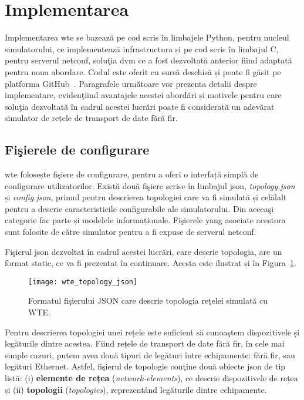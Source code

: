 \section{Implementarea}

Implementarea \gls{wte} se bazează pe cod scris în limbajele Python, pentru nucleul simulatorului, ce implementează infrastructura și pe cod scris în limbajul C, pentru serverul \gls{netconf}, soluţia \gls{dvm} ce a fost dezvoltată anterior fiind adaptată pentru noua abordare. Codul este oferit cu sursă deschisă și poate fi găsit pe platforma GitHub~\cite{wte2017}. Paragrafele următoare vor prezenta detalii despre implementare, evidenţiind avantajele acestei abordări și motivele pentru care soluţia dezvoltată în cadrul acestei lucrări poate fi considerată un adevărat simulator de rețele de transport de date fără fir. 

\subsection{Fişierele de configurare}

\gls{wte} folosește fişiere de configurare, pentru a oferi o interfață simplă de configurare utilizatorilor. Există două fişiere scrise în limbajul \gls{json}, \textit{topology.json} și \textit{config.json}, primul pentru descrierea topologiei care va fi simulată și celălalt pentru a descrie caracteristicile configurabile ale simulatorului. Din aceeaşi categorie fac parte și modelele informaționale. Fişierele \gls{yang} asociate acestora sunt folosite de către simulator pentru a fi expuse de serverul \gls{netconf}.

Fişierul \gls{json} dezvoltat în cadrul acestei lucrări, care descrie topologia, are un format static, ce va fi prezentat în continuare. Acesta este ilustrat și în Figura~\ref{fig:wte_topology_json}.

\begin{figure}[h]
	\centering
	\texttt{[image: wte\_topology\_json]}
	\caption{Formatul fişierului JSON care descrie topologia rețelei simulată cu WTE.}
	\label{fig:wte_topology_json}
\end{figure}

Pentru descrierea topologiei unei rețele este suficient să cunoaştem dispozitivele și legăturile dintre acestea. Fiind rețele de transport de date fără fir, în cele mai simple cazuri, putem avea două tipuri de legături între echipamente: fără fir, sau legături Ethernet. Astfel, fişierul de topologie conţine două obiecte \gls{json} de tip listă: (i) \textbf{elemente de rețea} (\textit{network-elements}), ce descrie dispozitivele de rețea și (ii) \textbf{topologii} (\textit{topologies}), reprezentând legăturile dintre echipamente.


